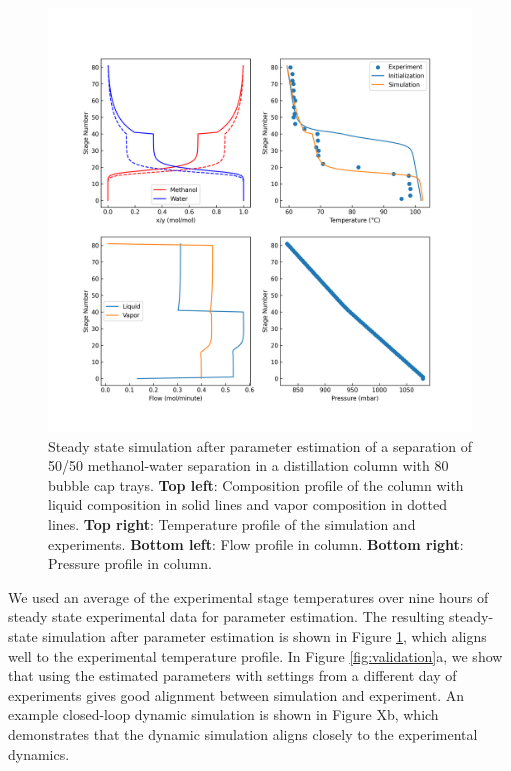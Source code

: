 \begin{figure}
    \centering
    \includegraphics[width=\textwidth]{gfx/Chapter06/2021_11_17_steady_state_estimated.png}
    \caption{Steady state simulation after parameter estimation of a separation of 50/50 methanol-water separation in a distillation column with 80 bubble cap trays. \textbf{Top left}: Composition profile of the column with liquid composition in solid lines and vapor composition in dotted lines. \textbf{Top right}: Temperature profile of the simulation and experiments. \textbf{Bottom left}: Flow profile in column. \textbf{Bottom right}: Pressure profile in column.  }
    \label{fig:estimated}
\end{figure}

We used an average of the experimental stage temperatures over nine hours of steady state experimental data for parameter estimation. The resulting steady-state simulation after parameter estimation is shown in Figure \ref{fig:estimated}, which aligns well to the experimental temperature profile.  In Figure \ref{fig:validation}a, we show that using the estimated parameters with settings from a different day of experiments gives good alignment between simulation and experiment.  An example closed-loop dynamic simulation is shown in Figure Xb, which demonstrates that the dynamic simulation aligns closely to the experimental dynamics. 

